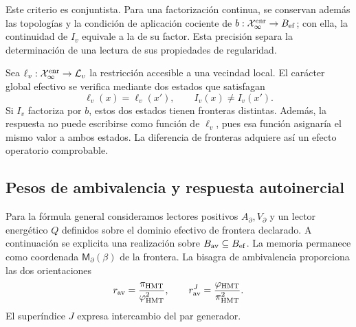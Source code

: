 Este criterio es conjuntista. Para una factorización continua, se
conservan además las topologías y la condición de aplicación cociente
de \(b:\mathcal X_\infty^{\rm enr}\to B_{\rm ef}\); con ella, la
continuidad de \(I_v\) equivale a la de su factor. Esta precisión
separa la determinación de una lectura de sus propiedades de regularidad.

Sea \(\ell_v:\mathcal X_\infty^{\rm enr}\to\mathcal L_v\) la
restricción accesible a una vecindad local. El carácter global efectivo
se verifica mediante dos estados que satisfagan
\begin{equation}
 \ell_v(x)=\ell_v(x'),\qquad I_v(x)\neq I_v(x').
 \label{vii:vii:eq:observador-testigo-global}
\end{equation}
Si \(I_v\) factoriza por \(b\), estos dos estados tienen fronteras
distintas. Además, la respuesta no puede escribirse como función de
\(\ell_v\), pues esa función asignaría el mismo valor a ambos estados.
La diferencia de fronteras adquiere así un efecto operatorio comprobable.

\subsection{Pesos de ambivalencia y respuesta autoinercial}
\label{vii:vii:sec:observador-ambivalencia}

Para la fórmula general consideramos lectores positivos
\(A_\partial,V_\partial\) y un lector energético \(Q\)
definidos sobre el dominio efectivo de frontera declarado.
A continuación se explicita una realización sobre
\(B_{\rm av}\subseteq B_{\rm ef}\). La memoria permanece como coordenada
\(\mathsf M_\partial(\beta)\) de la frontera. La bisagra de
ambivalencia proporciona las dos orientaciones
\[
 r_{\rm av}=\frac{\pi_{\rm HMT}}{\varphi_{\rm HMT}^2},\qquad
 r_{\rm av}^{J}=\frac{\varphi_{\rm HMT}}{\pi_{\rm HMT}^2}.
\]
El superíndice \(J\) expresa intercambio del par generador.
